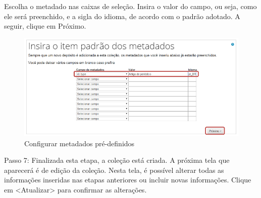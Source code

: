 \documentclass[12pt,hidelinks]{article}
\begin{document}
    \singlespacing
    
    Escolha o metadado nas caixas de seleção. Insira o valor do campo, ou seja, como ele será preenchido, e a sigla do idioma, de acordo com o padrão adotado. A seguir, clique em Próximo.
    
    \begin{figure}[!htp]
                \centering
                \includegraphics[scale=0.7]{figura/Figura38.png}
                \caption{Configurar metadados pré-definidos}
            \label{Rotulo}
        \end{figure}
        
\newpage

    Passo 7: Finalizada esta etapa, a coleção está criada. A próxima tela que aparecerá é de edição
    da coleção. Nesta tela, é possível alterar todas as informações inseridas nas etapas anteriores ou incluir novas informações. Clique em <Atualizar> para confirmar as alterações.
    
\end{document}
